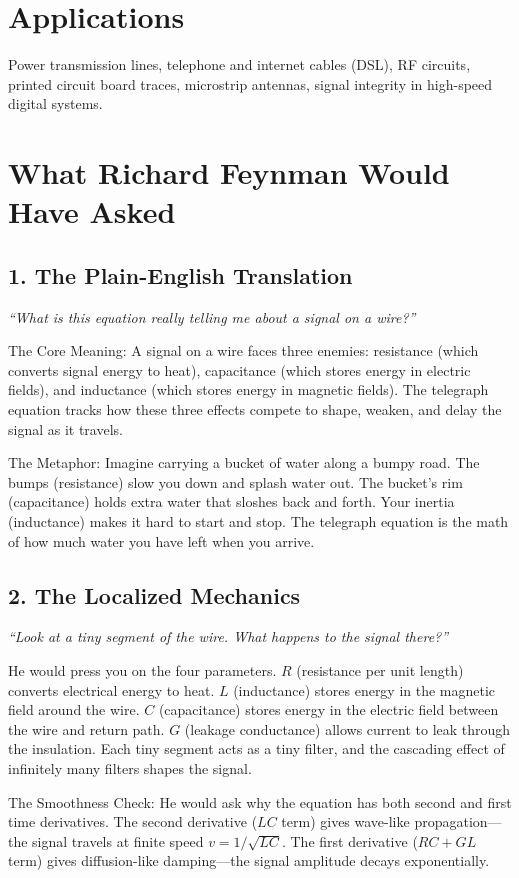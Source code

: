 \documentclass[11pt,openright]{book}
\begin{document}
\section*{Applications}

Power transmission lines, telephone and internet cables (DSL), RF circuits, printed circuit board traces, microstrip antennas, signal integrity in high-speed digital systems.
\section*{What Richard Feynman Would Have Asked}

\subsection*{1. The Plain-English Translation}
\textit{``What is this equation really telling me about a signal on a wire?''}

The Core Meaning: A signal on a wire faces three enemies: resistance (which converts signal energy to heat), capacitance (which stores energy in electric fields), and inductance (which stores energy in magnetic fields). The telegraph equation tracks how these three effects compete to shape, weaken, and delay the signal as it travels.

The Metaphor: Imagine carrying a bucket of water along a bumpy road. The bumps (resistance) slow you down and splash water out. The bucket's rim (capacitance) holds extra water that sloshes back and forth. Your inertia (inductance) makes it hard to start and stop. The telegraph equation is the math of how much water you have left when you arrive.

\subsection*{2. The Localized Mechanics}
\textit{``Look at a tiny segment of the wire. What happens to the signal there?''}

He would press you on the four parameters. $R$ (resistance per unit length) converts electrical energy to heat. $L$ (inductance) stores energy in the magnetic field around the wire. $C$ (capacitance) stores energy in the electric field between the wire and return path. $G$ (leakage conductance) allows current to leak through the insulation. Each tiny segment acts as a tiny filter, and the cascading effect of infinitely many filters shapes the signal.

The Smoothness Check: He would ask why the equation has both second and first time derivatives. The second derivative ($LC$ term) gives wave-like propagation---the signal travels at finite speed $v = 1/\sqrt{LC}$. The first derivative ($RC + GL$ term) gives diffusion-like damping---the signal amplitude decays exponentially.
\end{document}
